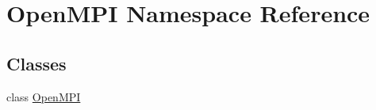 \hypertarget{namespace_open_m_p_i}{\section{Open\-M\-P\-I Namespace Reference}
\label{namespace_open_m_p_i}
}
\subsection*{Classes}
\begin{DoxyCompactItemize}
\item 
class \hyperlink{class_open_m_p_i_1_1_open_m_p_i}{Open\-M\-P\-I}
\end{DoxyCompactItemize}
